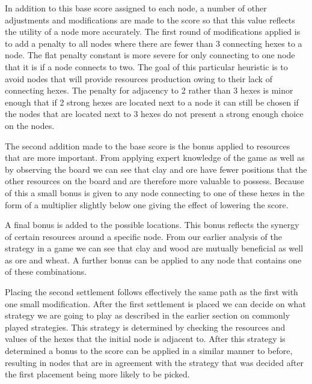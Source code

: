 \documentclass[]{article}
\begin{document}
\par In addition to this base score assigned to each node, a number of other adjustments and modifications are made to the score so that this value reflects the utility of a node more accurately. The first round of modifications applied is to add a penalty to all nodes where there are fewer than 3 connecting hexes to a node. The flat penalty constant is more severe for only connecting to one node that it is if a node connects to two. The goal of this particular heuristic is to avoid nodes that will provide resources production owing to their lack of connecting hexes. The penalty for adjacency to 2 rather than 3 hexes is minor enough that if 2 strong hexes are located next to a node it can still be chosen if the nodes that are located next to 3 hexes do not present a strong enough choice on the nodes.

\par The second addition made to the base score is the bonus applied to resources that are more important. From applying expert knowledge of the game as well as by observing the board we can see that clay and ore have fewer positions that the other resources on the board and are therefore more valuable to possess. Because of this a small bonus is given to any node connecting to one of these hexes in the form of a multiplier slightly below one giving the effect of lowering the score.


\par A final bonus is added to the possible locations. This bonus reflects the synergy of certain resources around a specific node. From our earlier analysis of the strategy in a game we can see that clay and wood are mutually beneficial as well as ore and wheat. A further bonus can be applied to any node that contains one of these combinations.

\par Placing the second settlement follows effectively the same path as the first with one small modification. After the first settlement is placed we can decide on what strategy we are going to play as described in the earlier section on commonly played strategies. This strategy is determined by checking the resources and values of the hexes that the initial node is adjacent to. After this strategy is determined a bonus to the score can be applied in a similar manner to before, resulting in nodes that are in agreement with the strategy that was decided after the first placement being more likely to be picked.
\end{document}
